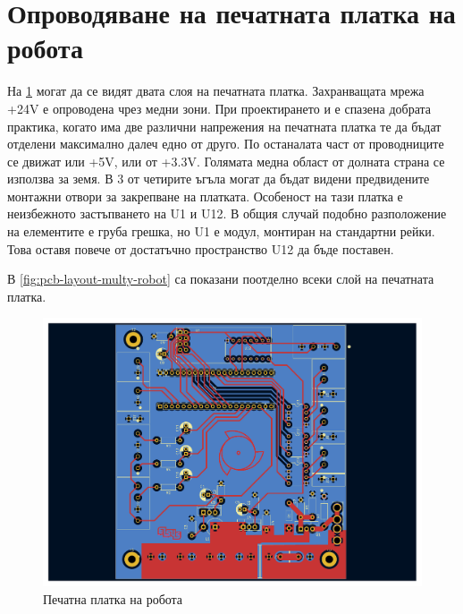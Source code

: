 
\section{Опроводяване на печатната платка на робота}

На \cref{fig:pcb-layout-color-robot} могат да се видят двата слоя на печатната платка. Захранващата мрежа +24V е опроводена чрез медни зони. При проектирането и е спазена добрата практика, когато има две различни напрежения на печатната платка те да бъдат отделени максимално далеч едно от друго. По останалата част от проводниците се движат или +5V, или от +3.3V. Голямата медна област от долната страна се използва за земя. В 3 от четирите ъгъла могат да бъдат видени предвидените монтажни отвори за закрепване на платката. Особеност на тази платка е неизбежното застъпването на U1 и U12. В общия случай подобно разположение на елементите е груба грешка, но U1 е модул, монтиран на стандартни рейки. Това оставя повече от достатъчно пространство U12 да бъде поставен. 

В \cref{fig:pcb-layout-multy-robot} са показани поотделно всеки слой на печатната платка.

\begin{figure}[H]
    \centering
    \includegraphics[width=\linewidth]{documents/PCB-layout-color-robot.pdf}
    
    \caption{Печатна платка на робота}
    \label{fig:pcb-layout-color-robot} 
\end{figure}


